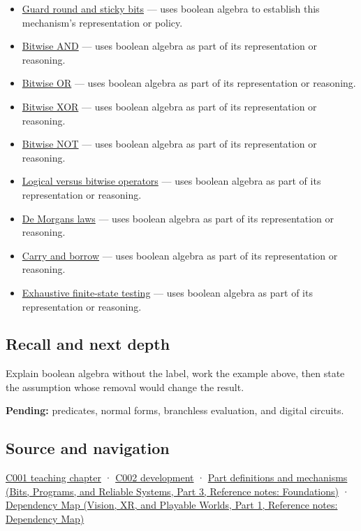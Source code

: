 \begin{itemize}
\item
  \hyperref[appendix-b572b631069b]{Guard round and sticky bits} --- uses boolean algebra to establish this mechanism's representation or policy.
\item
  \hyperref[appendix-68b52453737c]{Bitwise AND} --- uses boolean algebra as part of its representation or reasoning.
\item
  \hyperref[appendix-a427ce8ce8a6]{Bitwise OR} --- uses boolean algebra as part of its representation or reasoning.
\item
  \hyperref[appendix-d49161831368]{Bitwise XOR} --- uses boolean algebra as part of its representation or reasoning.
\item
  \hyperref[appendix-8f38927cfc54]{Bitwise NOT} --- uses boolean algebra as part of its representation or reasoning.
\item
  \hyperref[appendix-fe6b457d68d8]{Logical versus bitwise operators} --- uses boolean algebra as part of its representation or reasoning.
\item
  \hyperref[appendix-9079d3659da4]{De Morgan\textquotesingle s laws} --- uses boolean algebra as part of its representation or reasoning.
\item
  \hyperref[appendix-d52d5f78ffd1]{Carry and borrow} --- uses boolean algebra as part of its representation or reasoning.
\item
  \hyperref[appendix-05db24ccc28a]{Exhaustive finite-state testing} --- uses boolean algebra as part of its representation or reasoning.
\end{itemize}

\subsection{Recall and next depth}\label{appendix-24475e1596a8-recall-and-next-depth}

\hypertarget{appendix-24475e1596a8-recall-and-next-depth}{}

Explain boolean algebra without the label, work the example above, then state the assumption whose removal would change the result.

\textbf{Pending:} predicates, normal forms, branchless evaluation, and digital circuits.

\subsection{Source and navigation}\label{appendix-24475e1596a8-source-and-navigation}

\hypertarget{appendix-24475e1596a8-source-and-navigation}{}

\hyperref[01-foundations-i-ch001-from-a-signal-to-an-interpretation]{C001 teaching chapter} · \hyperref[01-foundations-i-ch001-arithmetic-becomes-a-policy]{C002 development} · \href{../01-Bits-Programs-and-Reliable-Systems-P03/main.pdf\#nameddest=appendix-fd090d982a15}{Part definitions and mechanisms (Bits, Programs, and Reliable Systems, Part 3, Reference notes: Foundations)} · \href{../07-Vision-XR-and-Playable-Worlds-P01/main.pdf\#nameddest=appendix-4ad47bdd269a}{Dependency Map (Vision, XR, and Playable Worlds, Part 1, Reference notes: Dependency Map)}
